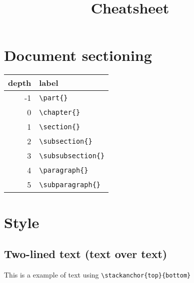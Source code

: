 \documentclass{customSynthesis}
\begin{document}
\title{Cheatsheet}

\section*{Document sectioning}

\begin{tabular}{r|l}
\hline 
depth & label \\ 
\hline 
-1 &  \verb|\part{}| \\ 
\hline 
0 & \verb|\chapter{}| \\ 
\hline 
1 & \verb|\section{}| \\ 
\hline 
2 & \verb|\subsection{}| \\ 
\hline 
3 & \verb|\subsubsection{}| \\ 
\hline 
4 & \verb|\paragraph{}| \\ 
\hline 
5 & \verb|\subparagraph{}| \\ 
\hline 
\end{tabular}

\section*{Style}

\subsection*{Two-lined text (text over text)}

This is a example of  text using \verb|\stackanchor{top}{bottom}|
\end{document}
